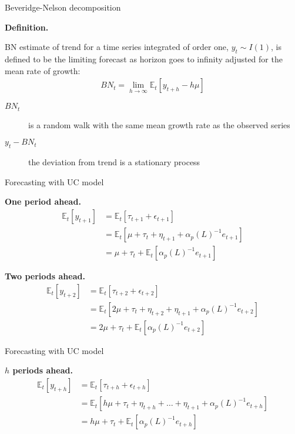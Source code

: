 \documentclass[notes,blackandwhite,mathsans,usenames,dvipsnames]{beamer}
\begin{document}
\begin{frame}{Beveridge-Nelson decomposition}

\textbf{Definition.}

 BN {\color{mcxs2}estimate of trend for a time series integrated of order one,} $y_t\sim I(1)${\color{mcxs2}, is defined to be the limiting forecast as horizon goes to infinity adjusted for the mean rate of growth:}
\begin{align*}
BN_t = \lim_{h\rightarrow\infty}\mathbb{E}_t\left[y_{t+h}-h\mu\right]
\end{align*}

\bigskip\begin{description}
\item[$BN_t$] {\color{mcxs2}is a random walk with the same mean growth rate as the observed series}
\item[$y_t - BN_t$] {\color{mcxs2}the deviation from trend is a stationary process}
\end{description}

\end{frame}




\begin{frame}{Forecasting with UC model}

\textbf{One period ahead.}
\begin{align*}
\mathbb{E}_t[y_{t+1}] &= \mathbb{E}_t[\tau_{t+1} + \epsilon_{t+1}]\\
&= \mathbb{E}_t[\mu + \tau_{t} + \eta_{t+1} + \alpha_p(L)^{-1}e_{t+1}]\\
&= \mu + \tau_{t} + \mathbb{E}_t[\alpha_p(L)^{-1}e_{t+1}]
\end{align*}

\textbf{Two periods ahead.}
\begin{align*}
\mathbb{E}_t[y_{t+2}] &= \mathbb{E}_t[\tau_{t+2} + \epsilon_{t+2}]\\
&= \mathbb{E}_t[2\mu + \tau_{t} + \eta_{t+2}+ \eta_{t+1} + \alpha_p(L)^{-1}e_{t+2}]\\
&= 2\mu + \tau_{t} + \mathbb{E}_t[\alpha_p(L)^{-1}e_{t+2}]
\end{align*}

\end{frame}



\begin{frame}{Forecasting with UC model}

\textbf{$h$ periods ahead.}
\begin{align*}
\mathbb{E}_t[y_{t+h}] &= \mathbb{E}_t[\tau_{t+h} + \epsilon_{t+h}]\\
&= \mathbb{E}_t[h\mu + \tau_{t} + \eta_{t+h}+\dots+ \eta_{t+1} + \alpha_p(L)^{-1}e_{t+h}]\\
&= h\mu + \tau_{t} + \mathbb{E}_t[\alpha_p(L)^{-1}e_{t+h}]\end{align*}

\end{frame}
\end{document}

